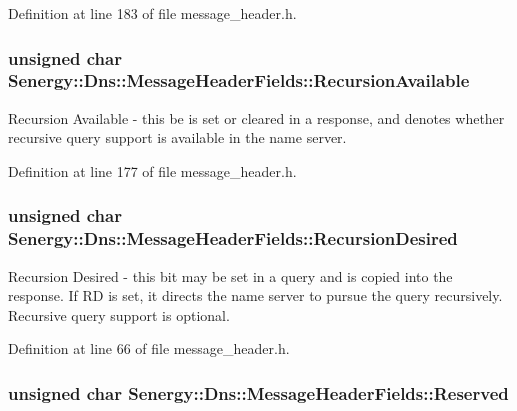 Definition at line 183 of file message\-\_\-header.\-h.

\hypertarget{struct_senergy_1_1_dns_1_1_message_header_fields_afbb68b60a28f855e64eb13615fc2633e}{
\subsubsection[{Recursion\-Available}]{\setlength{\rightskip}{0pt plus 5cm}unsigned char Senergy\-::\-Dns\-::\-Message\-Header\-Fields\-::\-Recursion\-Available}}\label{struct_senergy_1_1_dns_1_1_message_header_fields_afbb68b60a28f855e64eb13615fc2633e}


Recursion Available -\/ this be is set or cleared in a response, and denotes whether recursive query support is available in the name server. 



Definition at line 177 of file message\-\_\-header.\-h.

\hypertarget{struct_senergy_1_1_dns_1_1_message_header_fields_ab5d7c8933016bb7288462b4a0ac131a5}{
\subsubsection[{Recursion\-Desired}]{\setlength{\rightskip}{0pt plus 5cm}unsigned char Senergy\-::\-Dns\-::\-Message\-Header\-Fields\-::\-Recursion\-Desired}}\label{struct_senergy_1_1_dns_1_1_message_header_fields_ab5d7c8933016bb7288462b4a0ac131a5}


Recursion Desired -\/ this bit may be set in a query and is copied into the response. If R\-D is set, it directs the name server to pursue the query recursively. Recursive query support is optional. 



Definition at line 66 of file message\-\_\-header.\-h.

\hypertarget{struct_senergy_1_1_dns_1_1_message_header_fields_afb988d15085d4f740df367d1792440c7}{
\subsubsection[{Reserved}]{\setlength{\rightskip}{0pt plus 5cm}unsigned char Senergy\-::\-Dns\-::\-Message\-Header\-Fields\-::\-Reserved}}\label{struct_senergy_1_1_dns_1_1_message_header_fields_afb988d15085d4f740df367d1792440c7}


